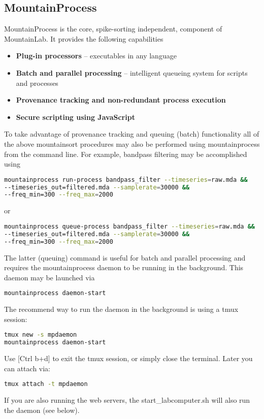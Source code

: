 \documentclass{article}
\begin{document}
\subsection{MountainProcess}

MountainProcess is the core, spike-sorting independent, component of MountainLab. It provides the following capabilities
\begin{itemize}
\item{\textbf{Plug-in processors} -- executables in any language}
\item{\textbf{Batch and parallel processing} -- intelligent queueing system for scripts and processes}
\item{\textbf{Provenance tracking and non-redundant process execution}}
\item{\textbf{Secure scripting using JavaScript}}
\end{itemize}

To take advantage of provenance tracking and queuing (batch) functionality all of the above mountainsort procedures may also be performed using mountainprocess from the command line. For example, bandpass filtering may be accomplished using
\begin{lstlisting}[language=bash]
mountainprocess run-process bandpass_filter --timeseries=raw.mda &&
--timeseries_out=filtered.mda --samplerate=30000 &&
--freq_min=300 --freq_max=2000
\end{lstlisting}
or
\begin{lstlisting}[language=bash]
mountainprocess queue-process bandpass_filter --timeseries=raw.mda &&
--timeseries_out=filtered.mda --samplerate=30000 &&
--freq_min=300 --freq_max=2000
\end{lstlisting}

The latter (queuing) command is useful for batch and parallel processing and requires the mountainprocess daemon to be running in the background. This daemon may be launched via
\begin{lstlisting}[language=bash]
mountainprocess daemon-start
\end{lstlisting}
The recommend way to run the daemon in the background is using a tmux session:
\begin{lstlisting}[language=bash]
tmux new -s mpdaemon
mountainprocess daemon-start
\end{lstlisting}
Use [Ctrl b+d] to exit the tmux session, or simply close the terminal. Later you can attach via:
\begin{lstlisting}[language=bash]
tmux attach -t mpdaemon
\end{lstlisting}
If you are also running the web servers, the start\_labcomputer.sh will also run the daemon (see below).
\end{document}

